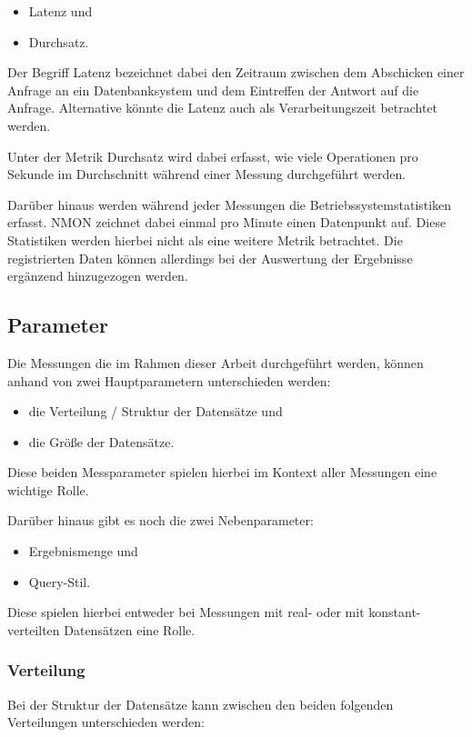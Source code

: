 \begin{itemize}
    \item Latenz und 
    \item Durchsatz.
\end{itemize}

Der Begriff Latenz bezeichnet dabei den Zeitraum zwischen dem Abschicken einer Anfrage an ein Datenbanksystem und dem Eintreffen der Antwort auf die Anfrage. Alternative könnte die Latenz auch als Verarbeitungszeit betrachtet werden. 

Unter der Metrik Durchsatz wird dabei erfasst, wie viele Operationen pro Sekunde im Durchschnitt während einer Messung durchgeführt werden. 

Darüber hinaus werden während jeder Messungen die Betriebssystemstatistiken erfasst. NMON zeichnet dabei einmal pro Minute einen Datenpunkt auf. Diese Statistiken werden hierbei nicht als eine weitere Metrik betrachtet. Die registrierten Daten können allerdings bei der Auswertung der Ergebnisse ergänzend hinzugezogen werden.

\subsection{Parameter}
\label{analyse:parameter}
Die Messungen die im Rahmen dieser Arbeit durchgeführt werden, können anhand von zwei Hauptparametern unterschieden werden:
\begin{itemize}
    \item die Verteilung / Struktur der Datensätze und 
    \item die Größe der Datensätze. 
\end{itemize}
Diese beiden Messparameter spielen hierbei im Kontext aller Messungen eine wichtige Rolle. 

Darüber hinaus gibt es noch die zwei Nebenparameter:
\begin{itemize}
    \item Ergebnismenge und 
    \item Query-Stil. 
\end{itemize}
Diese spielen hierbei entweder bei Messungen mit real- oder mit konstant-verteilten Datensätzen eine Rolle.  

\subsubsection{Verteilung}
Bei der Struktur der Datensätze kann zwischen den beiden folgenden Verteilungen unterschieden werden: 

